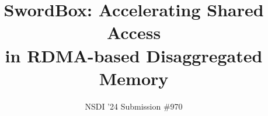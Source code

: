 \documentclass[sigconf,10pt]{acmart}
\newcommand{\sword}{SwordBox}
\begin{document}

\title[\sword]{\sword: Accelerating Shared Access\\in RDMA-based Disaggregated Memory}

\author{NSDI '24 Submission \#970}




\maketitle










\newpage

\balance
{\footnotesize 
}

\appendix

\end{document}
